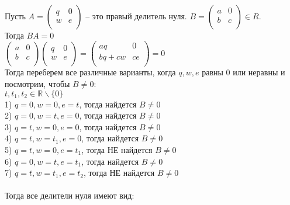 \documentclass[12pt,a4paper]{scrartcl}
\begin{document}
	\\
	Пусть $A = \begin{pmatrix}
	q&0\\
	w&e\\
	\end{pmatrix}$ -- это правый делитель нуля. $B = \begin{pmatrix}
	a&0\\
	b&c\\
	\end{pmatrix} \in R$.\\
	Тогда $BA = 0$ \\
	$\begin{pmatrix}
	a&0\\
	b&c\\
	\end{pmatrix} \begin{pmatrix}
	q&0\\
	w&e\\
	\end{pmatrix}= \begin{pmatrix}
	aq&0\\
	bq + cw&ce\\
	\end{pmatrix} = 0$\\
	Тогда переберем все различные варианты, когда $q, w, e$ равны 0 или неравны и посмотрим, чтобы $B \neq 0$:\\
	$t, t_1, t_2 \in \mathbb{R} \backslash \{0\}$ \\
	1) $q = 0, w = 0, e = t$, тогда найдется $B \neq 0$\\
	2) $q = 0, w = t, e = 0$, тогда найдется $B \neq 0$\\
	3) $q = t, w = 0, e = 0$, тогда найдется $B \neq 0$\\
	4) $q = t, w = t_1, e = 0$, тогда найдется $B \neq 0$\\
	5) $q = t, w = 0, e = t_1$, тогда НЕ найдется $B \neq 0$\\
	6) $q = 0, w = t, e = t_1$, тогда найдется $B \neq 0$\\
	7) $q = t, w = t_1, e = t_2$, тогда НЕ найдется $B \neq 0$\\
	\\
	Тогда все делители нуля имеют вид:\\
\end{document}
